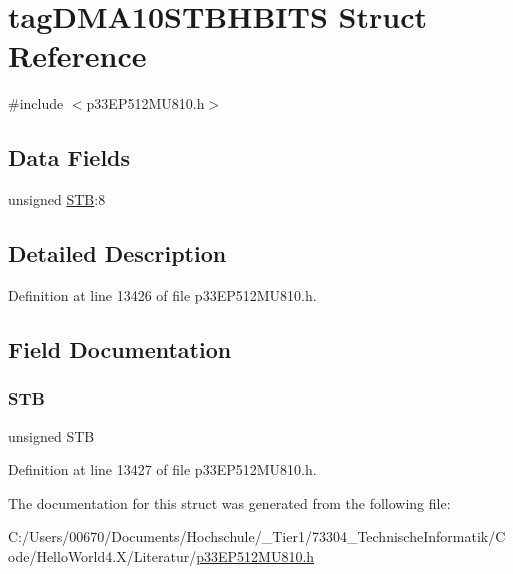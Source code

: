 \hypertarget{structtag_d_m_a10_s_t_b_h_b_i_t_s}{}\section{tag\+D\+M\+A10\+S\+T\+B\+H\+B\+I\+TS Struct Reference}
\label{structtag_d_m_a10_s_t_b_h_b_i_t_s}


{\ttfamily \#include $<$p33\+E\+P512\+M\+U810.\+h$>$}

\subsection*{Data Fields}
\begin{DoxyCompactItemize}
\item 
unsigned \hyperlink{structtag_d_m_a10_s_t_b_h_b_i_t_s_a9bd043a4db27e09b5035a563a8758fe7}{S\+TB}\+:8
\end{DoxyCompactItemize}


\subsection{Detailed Description}


Definition at line 13426 of file p33\+E\+P512\+M\+U810.\+h.



\subsection{Field Documentation}
\mbox{\label{structtag_d_m_a10_s_t_b_h_b_i_t_s_a9bd043a4db27e09b5035a563a8758fe7}} 
\subsubsection{\texorpdfstring{S\+TB}{STB}}
{\footnotesize\ttfamily unsigned S\+TB}



Definition at line 13427 of file p33\+E\+P512\+M\+U810.\+h.



The documentation for this struct was generated from the following file\+:\begin{DoxyCompactItemize}
\item 
C\+:/\+Users/00670/\+Documents/\+Hochschule/\+\_\+\+Tier1/73304\+\_\+\+Technische\+Informatik/\+Code/\+Hello\+World4.\+X/\+Literatur/\hyperlink{p33_e_p512_m_u810_8h}{p33\+E\+P512\+M\+U810.\+h}\end{DoxyCompactItemize}
